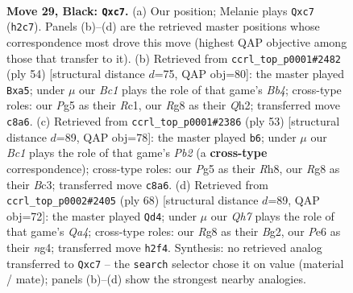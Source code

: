 \documentclass[11pt]{article}
\begin{document}
\clearpage

\begin{figure}[p]\centering
\begin{subfigure}{0.46\textwidth}\centering
\resizebox{\linewidth}{!}{%
\newchessgame
\chessboard[
  setfen={1rb3r1/p1Q2pk1/2p1p2p/2P3p1/8/3B4/P6q/R2KR3 b - - 0 29},
  showmover=false,
  pgfstyle=straightmove, color=movearrow, markmove={h2-c7}
]}
\caption{}
\end{subfigure}\hfill
\begin{subfigure}{0.46\textwidth}\centering
\resizebox{\linewidth}{!}{%
\newchessgame
\chessboard[
  setfen={4r1k1/3b1p1p/6r1/p2P4/1B1q4/P1R5/5PPQ/2R3K1 w - - 0 28},
  showmover=false,
  pgfstyle=straightmove, color=movearrow, markmove={b4-a5}
]}
\caption{}
\end{subfigure}
\\[4pt]
\begin{subfigure}{0.46\textwidth}\centering
\resizebox{\linewidth}{!}{%
\newchessgame
\chessboard[
  setfen={2r4r/pp1Q1pk1/7p/3p4/8/2b1PP2/3q1BP1/1R3RK1 b - - 7 27},
  showmover=false,
  pgfstyle=straightmove, color=movearrow, markmove={b7-b6}
]}
\caption{}
\end{subfigure}\hfill
\begin{subfigure}{0.46\textwidth}\centering
\resizebox{\linewidth}{!}{%
\newchessgame
\chessboard[
  setfen={4rk2/5p2/3p4/3P1b2/Q5nP/P7/1B1q1PB1/2R3K1 w - - 3 35},
  showmover=false,
  pgfstyle=straightmove, color=movearrow, markmove={a4-d4}
]}
\caption{}
\end{subfigure}
\caption{\textbf{Move 29, Black: \texttt{Qxc7}.} (a) Our position; Melanie plays \texttt{Qxc7} (\texttt{h2c7}). Panels (b)--(d) are the retrieved master positions whose correspondence most drove this move (highest QAP objective among those that transfer to it). (b) Retrieved from \texttt{ccrl\_top\_p0001\#2482} (ply 54) [structural distance $d$=75, QAP obj=80]: the master played \texttt{Bxa5}; under $\mu$ our \emph{Bc1} plays the role of that game's \emph{Bb4}; cross-type roles: our \emph{P}g5 as their \emph{R}c1, our \emph{R}g8 as their \emph{Q}h2; transferred move \texttt{c8a6}. (c) Retrieved from \texttt{ccrl\_top\_p0001\#2386} (ply 53) [structural distance $d$=89, QAP obj=78]: the master played \texttt{b6}; under $\mu$ our \emph{Bc1} plays the role of that game's \emph{Pb2} (a \textbf{cross-type} correspondence); cross-type roles: our \emph{P}g5 as their \emph{R}h8, our \emph{R}g8 as their \emph{B}c3; transferred move \texttt{c8a6}. (d) Retrieved from \texttt{ccrl\_top\_p0002\#2405} (ply 68) [structural distance $d$=89, QAP obj=72]: the master played \texttt{Qd4}; under $\mu$ our \emph{Qh7} plays the role of that game's \emph{Qa4}; cross-type roles: our \emph{R}g8 as their \emph{B}g2, our \emph{P}e6 as their \emph{n}g4; transferred move \texttt{h2f4}. Synthesis: no retrieved analog transferred to \texttt{Qxc7} -- the \texttt{search} selector chose it on value (material / mate); panels (b)--(d) show the strongest nearby analogies.}
\label{fig:thought-m57}
\end{figure}
\end{document}
